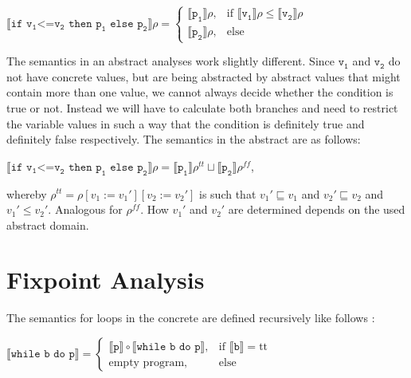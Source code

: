 \begin{center}
	$\llbracket\texttt{if v}_\texttt{1}\texttt{<=v}_\texttt{2} \texttt{ then p}_\texttt{1} \texttt{ else p}_\texttt{2}\rrbracket\rho = 
	\begin{cases}
		\llbracket\texttt{p}_\texttt{1}\rrbracket\rho, & \textrm{if } \llbracket\texttt{v}_\texttt{1}\rrbracket\rho \leq \llbracket\texttt{v}_\texttt{2}\rrbracket\rho\\
		\llbracket\texttt{p}_\texttt{2}\rrbracket\rho, & \textrm{else}
	\end{cases}$
\end{center} 
\vspace{2mm}
\noindent The semantics in an abstract analyses work slightly different. Since $\texttt{v}_\texttt{1}$ and $\texttt{v}_\texttt{2}$ do not have concrete values, but are being abstracted by abstract values that might contain more than one value, we cannot always decide whether the condition is true or not. Instead we will have to calculate both branches and need to restrict the variable values in such a way that the condition is definitely true and definitely false respectively. The semantics in the abstract are as follows:

\begin{center}
	$\llbracket\texttt{if v}_\texttt{1}\texttt{<=v}_\texttt{2} \texttt{ then p}_\texttt{1} \texttt{ else p}_\texttt{2}\rrbracket\rho = \llbracket\texttt{p}_\texttt{1}\rrbracket\rho^{t\!t} \sqcup\llbracket\texttt{p}_\texttt{2}\rrbracket\rho^{f\!\!f}$,
\end{center} 

\noindent whereby $\rho^{t\!t}=\rho[v_1:=v_1'][v_2:=v_2']$ is such that $v_1'\sqsubseteq v_1$ and $v_2'\sqsubseteq v_2$ and $v_1'\leq v_2'$. Analogous for $\rho^{f\!\!f}$. How  $v_1'$ and $v_2'$ are determined depends on the used abstract domain.

\section{Fixpoint Analysis}\label{sec:fixpoint_analysis}

The semantics for loops in the concrete are defined recursively like follows \cite{scott1971}:

\begin{center}
	$\llbracket\texttt{while b do p}\rrbracket = 
	\begin{cases}
		\llbracket\texttt{p}\rrbracket \circ \llbracket\texttt{while b do p}\rrbracket, & \textrm{if } \llbracket\texttt{b}\rrbracket=\textrm{tt}\\
		\textrm{empty program}, & \textrm{else}
	\end{cases}$
\end{center} 
\vspace{2mm}

